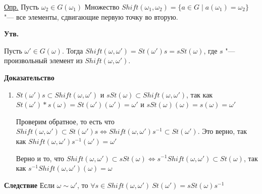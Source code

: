 \documentclass{article}
\begin{document}
\underline{Опр.} Пусть $\omega_2 \in G(\omega_1)$
Множество $Shift(\omega_1, \omega_2) = \{a \in G \mid a(\omega_1) = \omega_2\}$ "--- все элементы, сдвигающие первую точку во вторую.

\vspace{5pt}

\textbf{Утв.}

Пусть $\omega' \in G(\omega)$. Тогда $Shift(\omega, \omega') = St(\omega')s = sSt(\omega)$, где $s$ "--- произвольный элемент из $Shift(\omega, \omega')$.

\textbf{Доказательство}
\begin{enumerate}
	\item $St(\omega')s \subset Shift(\omega, \omega')$ и $sSt(\omega) \subset Shift(\omega, \omega')$, так как $St(\omega')*s(\omega) = St(\omega')(\omega') = \omega'$ и $sSt(\omega)(\omega) = s(\omega) = \omega'$
	
	Проверим обратное, то есть что $Shift(\omega, \omega') \subset St(\omega')s \Leftrightarrow Shift(\omega, \omega')s^{-1} \subset St(\omega')$. 
	Это верно, так как 	
	$Shift(\omega, \omega')s^{-1}(\omega') = \omega'$
	
	Верно и то, что $Shift(\omega, \omega') \subset sSt(\omega) \Leftrightarrow s^{-1}Shift(\omega, \omega') \subset St(\omega)$, так как $s^{-1}Shift(\omega, \omega')(\omega) = \omega$
\end{enumerate} 

\vspace{5pt}

\textbf{Следствие}
Если $\omega \sim \omega'$, то $\forall s \in Shift(\omega, \omega') \   St(\omega') = sSt(\omega)s^{-1}$
\end{document}
